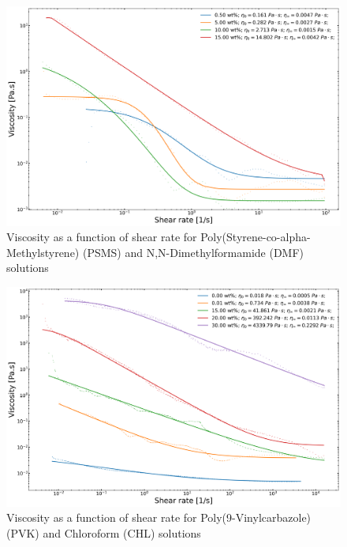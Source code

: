 \begin{figure}[!th]
\centering
\includegraphics[width=\textwidth]{./Figures/plt_PSMSwtinDMF.png}
\decoRule
\caption[Viscosity as a function of shear rate for Poly(Styrene-co-alpha-Methylstyrene) (PSMS) and N,N-Dimethylformamide (DMF) solutions]{Viscosity as a function of shear rate for Poly(Styrene-co-alpha-Methylstyrene) (PSMS) and N,N-Dimethylformamide (DMF) solutions}
\label{fig:plt_PSMSwtinDMF}
\end{figure}

\begin{figure}[!th]
\centering
\includegraphics[width=\textwidth]{./Figures/plt_PVKwtinCHL.png}
\decoRule
\caption[Viscosity as a function of shear rate for Poly(9-Vinylcarbazole) (PVK) and Chloroform (CHL) solutions]{Viscosity as a function of shear rate for Poly(9-Vinylcarbazole) (PVK) and Chloroform (CHL) solutions}
\label{fig:plt_PVKwtinCHL}
\end{figure}

